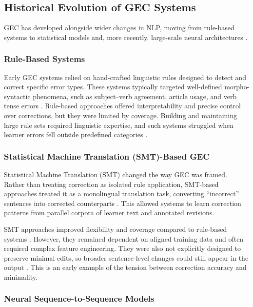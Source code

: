 \subsection{Historical Evolution of GEC Systems}

GEC has developed alongside wider changes in NLP, moving from rule-based systems to statistical models and, more recently, large-scale neural architectures \cite{10.1162/coli_a_00478}.

\subsubsection{Rule-Based Systems}

Early GEC systems relied on hand-crafted linguistic rules designed to detect and correct specific error types. These systems typically targeted well-defined morpho-syntactic phenomena, such as subject--verb agreement, article usage, and verb tense errors \cite{ng-etal-2014-conll}. Rule-based approaches offered interpretability and precise control over corrections, but they were limited by coverage. Building and maintaining large rule sets required linguistic expertise, and such systems struggled when learner errors fell outside predefined categories \cite{10.1162/coli_a_00478}.

\subsubsection{Statistical Machine Translation (SMT)-Based GEC}

Statistical Machine Translation (SMT) changed the way GEC was framed. Rather than treating correction as isolated rule application, SMT-based approaches treated it as a monolingual translation task, converting ``incorrect'' sentences into corrected counterparts \cite{brockett2006correcting}. This allowed systems to learn correction patterns from parallel corpora of learner text and annotated revisions.

SMT approaches improved flexibility and coverage compared to rule-based systems \cite{ng-etal-2014-conll}. However, they remained dependent on aligned training data and often required complex feature engineering. They were also not explicitly designed to preserve minimal edits, so broader sentence-level changes could still appear in the output \cite{10.1162/coli_a_00478}. This is an early example of the tension between correction accuracy and minimality.

\subsubsection{Neural Sequence-to-Sequence Models}

